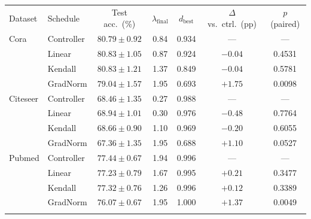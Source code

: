\begin{table}[th]
{\setlength{\tabcolsep}{3pt}\begin{tabular*}{\textwidth}{@{\extracolsep{\fill}}llccccc}
\toprule
Dataset & Schedule & Test acc.\ (\%) & $\lambda_{\mathrm{final}}$ & $d_{\mathrm{best}}$ & $\Delta$ vs.\ ctrl.\ (pp) & $p$ (paired) \\
\colrule
Cora & Controller & $80.79 \pm 0.92$ & 0.84 & 0.934 & --- & --- \\
 & Linear & $80.83 \pm 1.05$ & 0.87 & 0.924 & $-0.04$ & 0.4531 \\
 & Kendall & $80.83 \pm 1.21$ & 1.37 & 0.849 & $-0.04$ & 0.5781 \\
 & GradNorm & $79.04 \pm 1.57$ & 1.95 & 0.693 & $+1.75$ & 0.0098 \\
\colrule
Citeseer & Controller & $68.46 \pm 1.35$ & 0.27 & 0.988 & --- & --- \\
 & Linear & $68.94 \pm 1.01$ & 0.30 & 0.976 & $-0.48$ & 0.7764 \\
 & Kendall & $68.66 \pm 0.90$ & 1.10 & 0.969 & $-0.20$ & 0.6055 \\
 & GradNorm & $67.36 \pm 1.35$ & 1.95 & 0.688 & $+1.10$ & 0.0527 \\
\colrule
Pubmed & Controller & $77.44 \pm 0.67$ & 1.94 & 0.996 & --- & --- \\
 & Linear & $77.23 \pm 0.79$ & 1.67 & 0.995 & $+0.21$ & 0.3477 \\
 & Kendall & $77.32 \pm 0.76$ & 1.26 & 0.996 & $+0.12$ & 0.3389 \\
 & GradNorm & $76.07 \pm 0.67$ & 1.95 & 1.000 & $+1.37$ & 0.0049 \\
\colrule
\botrule
\end{tabular*}}
\end{table}
